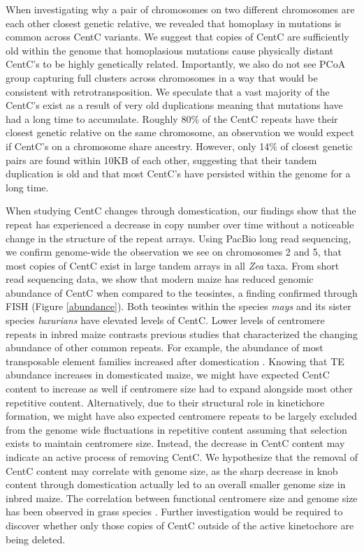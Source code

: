 {When investigating why a pair of chromosomes on two different chromosomes are each other closest genetic relative, we revealed that homoplasy in mutations is common across CentC variants.  We suggest that copies of CentC are sufficiently old within the genome that homoplasious mutations cause physically distant CentC’s to be highly genetically related.  Importantly, we also do not see PCoA group capturing full clusters across chromosomes in a way that would be consistent with retrotransposition. We speculate that a vast majority of the CentC’s exist as a result of very old duplications meaning that mutations have had a long time to accumulate. Roughly 80\% of the CentC repeats have their closest genetic relative on the same chromosome, an observation we would expect if CentC’s on a chromosome share ancestry.  However, only 14\% of closest genetic pairs are found within 10KB of each other, suggesting that their tandem duplication is old and that most CentC’s have persisted within the genome for a long time. 

When studying CentC changes through domestication, our findings show that the repeat has experienced a decrease in copy number over time without a noticeable change in the structure of the repeat arrays. Using PacBio long read sequencing, we confirm genome-wide the observation we see on chromosomes 2 and 5, that most copies of CentC exist in large tandem arrays in all \emph{Zea} taxa.  From short read sequencing data, we show that modern maize has reduced genomic abundance of CentC when compared to the teosintes, a finding confirmed through FISH (Figure \ref{abundance}).  Both teosintes within the species \emph{mays} and its sister species \emph{luxurians} have elevated levels of CentC.  Lower levels of centromere repeats in inbred maize contrasts previous studies that characterized the changing abundance of other common repeats.  For example, the abundance of most transposable element families increased after domestication \citep{Chia2012}.  Knowing that TE abundance increases in domesticated maize, we might have expected CentC content to increase as well if centromere size had to expand alongside most other repetitive content.  Alternatively, due to their structural role in kinetichore formation, we might have also expected centromere repeats to be largely excluded from the genome wide fluctuations in repetitive content assuming that selection exists to maintain centromere size.  Instead, the decrease in CentC content may indicate an active process of removing CentC.  We hypothesize that the removal of CentC content may correlate with genome size, as the sharp decrease in knob content through domestication actually led to an overall smaller genome size in inbred maize. The correlation between  functional  centromere size and genome size has been observed in grass species \citep{Zhang2012}.  Further investigation would be required to discover whether only those copies of CentC outside of the active kinetochore are being deleted.

}
